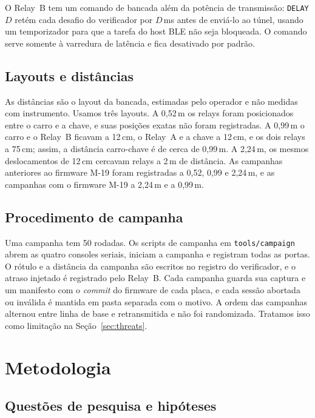 \documentclass{ieeeaccess}
\begin{document}
O Relay~B tem um comando de bancada além da potência de transmissão: \texttt{DELAY} $D$ retém cada desafio do verificador por $D$\,ms antes de enviá-lo ao túnel, usando um temporizador para que a tarefa do host BLE não seja bloqueada. O comando serve somente à varredura de latência e fica desativado por padrão.

\subsection{Layouts e distâncias}

As distâncias são o layout da bancada, estimadas pelo operador e não medidas com instrumento. Usamos três layouts. A 0,52\,m os relays foram posicionados entre o carro e a chave, e suas posições exatas não foram registradas. A 0,99\,m o carro e o Relay~B ficavam a 12\,cm, o Relay~A e a chave a 12\,cm, e os dois relays a 75\,cm; assim, a distância carro-chave é de cerca de 0,99\,m. A 2,24\,m, os mesmos deslocamentos de 12\,cm cercavam relays a 2\,m de distância. As campanhas anteriores ao firmware M-19 foram registradas a 0,52, 0,99 e 2,24\,m, e as campanhas com o firmware M-19 a 2,24\,m e a 0,99\,m.

\subsection{Procedimento de campanha}

Uma campanha tem 50 rodadas. Os scripts de campanha em \texttt{tools/campaign} abrem as quatro consoles seriais, iniciam a campanha e registram todas as portas. O rótulo e a distância da campanha são escritos no registro do verificador, e o atraso injetado é registrado pelo Relay~B. Cada campanha guarda sua captura e um manifesto com o \emph{commit} do firmware de cada placa, e cada sessão abortada ou inválida é mantida em pasta separada com o motivo. A ordem das campanhas alternou entre linha de base e retransmitida e não foi randomizada. Tratamos isso como limitação na Seção~\ref{sec:threats}.

\section{Metodologia}
\label{sec:method}

\subsection{Questões de pesquisa e hipóteses}
\end{document}

